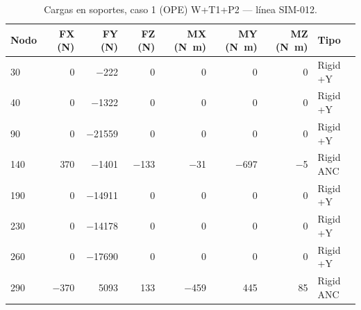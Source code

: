 \begin{table}[htbp]
  \centering
  \footnotesize
  \caption{Cargas en soportes, caso 1 (OPE) W+T1+P2 — línea SIM-012.}
  \label{tab:restricciones-ope}
  \begin{tabular}{lrrrrrrl}
    \toprule
    Nodo & FX (\si{N}) & FY (\si{N}) & FZ (\si{N}) & MX (\si{N.m}) & MY (\si{N.m}) & MZ (\si{N.m}) & Tipo \\
    \midrule
    30 & \num{0} & \num{-222} & \num{0} & \num{0} & \num{0} & \num{0} & Rigid +Y \\
    40 & \num{0} & \num{-1322} & \num{0} & \num{0} & \num{0} & \num{0} & Rigid +Y \\
    90 & \num{0} & \num{-21559} & \num{0} & \num{0} & \num{0} & \num{0} & Rigid +Y \\
    140 & \num{370} & \num{-1401} & \num{-133} & \num{-31} & \num{-697} & \num{-5} & Rigid ANC \\
    190 & \num{0} & \num{-14911} & \num{0} & \num{0} & \num{0} & \num{0} & Rigid +Y \\
    230 & \num{0} & \num{-14178} & \num{0} & \num{0} & \num{0} & \num{0} & Rigid +Y \\
    260 & \num{0} & \num{-17690} & \num{0} & \num{0} & \num{0} & \num{0} & Rigid +Y \\
    290 & \num{-370} & \num{5093} & \num{133} & \num{-459} & \num{445} & \num{85} & Rigid ANC \\
    \bottomrule
  \end{tabular}
\end{table}
